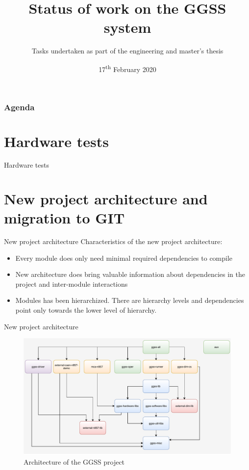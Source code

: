\documentclass[10pt]{beamer}
\title{Status of work on the GGSS system}
\subtitle{\normalsize{Tasks undertaken as part of the engineering and master's thesis}}
\date{17\textsuperscript{th} February 2020}
\author{\normalsize{Arkadiusz Kasprzak \newline \and Jarosław Cierpich \newline \and Grzegorz Podsiadło \newline \newline \and Supervisor: Bartosz Mindur}}
\begin{document}
\maketitle

\begin{frame}
\frametitle{Agenda}
\tableofcontents
\end{frame}

\section {Hardware tests}

\begin{frame}{Hardware tests}

\end{frame}

\section {New project architecture and migration to GIT}

\begin{frame}{New project architecture}
Characteristics of the new project architecture:
\begin{itemize}
	\item Every module does only need minimal required dependencies to compile
	\item New architecture does bring valuable information about dependencies in the project and inter-module interactions
	\item Modules has been hierarchized. There are hierarchy levels and dependencies point only towards the lower level of hierarchy.
\end{itemize}
\end{frame}

\begin{frame}{New project architecture}
\begin{figure}
\centering
\includegraphics[width=\linewidth]{resources/topLevelArchitecture}
\caption{Architecture of the GGSS project}
\end{figure}
\end{frame}
\end{document}

